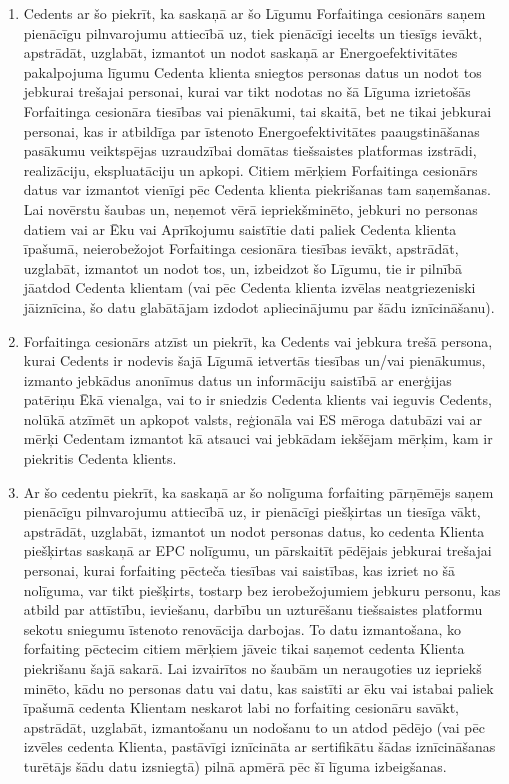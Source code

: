 \documentclass[a4paper]{article}
\begin{document}
\begin{multicols}{2}
\begin{enumerate}
  \item{Cedents ar šo piekrīt, ka saskaņā ar šo Līgumu Forfaitinga cesionārs
saņem pienācīgu pilnvarojumu attiecībā uz, tiek pienācīgi iecelts un
tiesīgs ievākt, apstrādāt, uzglabāt, izmantot un nodot saskaņā ar
Energoefektivitātes pakalpojuma līgumu Cedenta klienta sniegtos
personas datus un nodot tos jebkurai trešajai personai, kurai var tikt
nodotas no šā Līguma izrietošās Forfaitinga cesionāra tiesības vai
pienākumi, tai skaitā, bet ne tikai jebkurai personai, kas ir atbildīga par
īstenoto Energoefektivitātes paaugstināšanas pasākumu veiktspējas
uzraudzībai domātas tiešsaistes platformas izstrādi, realizāciju,
ekspluatāciju un apkopi. Citiem mērķiem Forfaitinga cesionārs datus
var izmantot vienīgi pēc Cedenta klienta piekrišanas tam saņemšanas.
Lai novērstu šaubas un, neņemot vērā iepriekšminēto, jebkuri no
personas datiem vai ar Ēku vai Aprīkojumu saistītie dati paliek Cedenta
klienta īpašumā, neierobežojot Forfaitinga cesionāra tiesības ievākt,
apstrādāt, uzglabāt, izmantot un nodot tos, un, izbeidzot šo Līgumu, tie
ir pilnībā jāatdod Cedenta klientam (vai pēc Cedenta klienta izvēlas
neatgriezeniski jāiznīcina, šo datu glabātājam izdodot apliecinājumu
par šādu iznīcināšanu).}

  \item{Forfaitinga cesionārs atzīst un piekrīt, ka Cedents vai jebkura trešā
persona, kurai Cedents ir nodevis šajā Līgumā ietvertās tiesības un/vai
pienākumus, izmanto jebkādus anonīmus datus un informāciju saistībā
ar enerģijas patēriņu Ēkā vienalga, vai to ir sniedzis Cedenta klients vai
ieguvis Cedents, nolūkā atzīmēt un apkopot valsts, reģionāla vai ES
mēroga datubāzi vai ar mērķi Cedentam izmantot kā atsauci vai
jebkādam iekšējam mērķim, kam ir piekritis Cedenta klients.}

  \item{Ar šo cedentu piekrīt, ka saskaņā ar šo nolīguma forfaiting pārņēmējs
saņem pienācīgu pilnvarojumu attiecībā uz, ir pienācīgi piešķirtas un
tiesīga vākt, apstrādāt, uzglabāt, izmantot un nodot personas datus, ko
cedenta Klienta piešķirtas saskaņā ar EPC nolīgumu, un pārskaitīt
pēdējais jebkurai trešajai personai, kurai forfaiting pēcteča tiesības vai
saistības, kas izriet no šā nolīguma, var tikt piešķirts, tostarp bez
ierobežojumiem jebkuru personu, kas atbild par attīstību, ieviešanu,
darbību un uzturēšanu tiešsaistes platformu sekotu sniegumu īstenoto
renovācija darbojas. To datu izmantošana, ko forfaiting pēctecim
citiem mērķiem jāveic tikai saņemot cedenta Klienta piekrišanu šajā
sakarā. Lai izvairītos no šaubām un neraugoties uz iepriekš minēto,
kādu no personas datu vai datu, kas saistīti ar ēku vai istabai paliek
īpašumā cedenta Klientam neskarot labi no forfaiting cesionāru savākt,
apstrādāt, uzglabāt, izmantošanu un nodošanu to un atdod pēdējo (vai
pēc izvēles cedenta Klienta, pastāvīgi iznīcināta ar sertifikātu šādas
iznīcināšanas turētājs šādu datu izsniegtā) pilnā apmērā pēc šī līguma
izbeigšanas.}


\end{enumerate}
\end{multicols}
\end{document}
